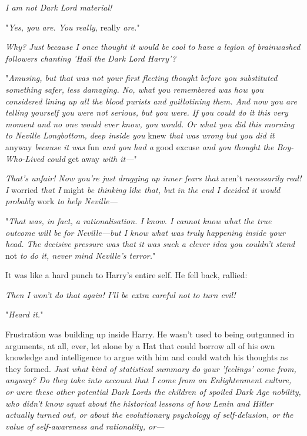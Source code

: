 \emph{I am not Dark Lord material!}

"\emph{Yes, you are. You really,} really\emph{ are.}"

\emph{Why? Just because I once thought it would be cool to have a legion of 
brainwashed followers chanting 'Hail the Dark Lord Harry'?}

"\emph{Amusing, but that was not your first fleeting thought before you 
substituted something safer, less damaging. No, what you remembered was how you 
considered lining up all the blood purists and guillotining them. And now you 
are telling yourself you were not serious, but you were. If you could do it 
this very moment and no one would ever know, you would. Or what you did this 
morning to Neville Longbottom, deep inside you} knew\emph{ that was wrong but 
you did it} anyway\emph{ because it was} fun\emph{ and you had a} good 
excuse\emph{ and you thought the Boy-Who-Lived could} get away\emph{ with 
it---}"

\emph{That's unfair! Now you're just dragging up inner fears that} aren't\emph{ 
necessarily real! I} worried\emph{ that I} might\emph{ be thinking like that, 
but in the end I decided it would probably} work\emph{ to help Neville---}

"\emph{That was, in fact, a rationalisation. I know. I cannot know what the 
true outcome will be for Neville---but I know what was truly happening inside 
your head. The decisive pressure was that it was such a clever idea you 
couldn't stand} not\emph{ to do it, never mind Neville's terror.}"

It was like a hard punch to Harry's entire self. He fell back, rallied:

\emph{Then I won't do that again! I'll be extra careful not to turn evil!}

"\emph{Heard it.}"

Frustration was building up inside Harry. He wasn't used to being outgunned in 
arguments, at all, ever, let alone by a Hat that could borrow all of his own 
knowledge and intelligence to argue with him and could watch his thoughts as 
they formed. \emph{Just what kind of statistical summary do your 'feelings' 
come from, anyway? Do they take into account that I come from an Enlightenment 
culture, or were these other potential Dark Lords the children of spoiled Dark 
Age nobility, who didn't know squat about the historical lessons of how Lenin 
and Hitler actually turned out, or about the evolutionary psychology of 
self-delusion, or the value of self-awareness and rationality, or---}

